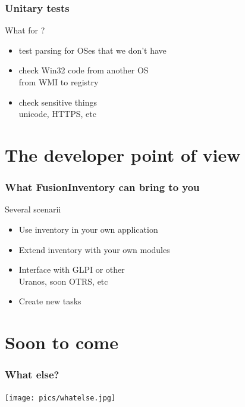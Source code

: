 \documentclass{beamer}
\begin{document}
\begin{frame}
    \frametitle{Unitary tests}

    \begin{block}{What for ?}
        \begin{itemize}
            \item test parsing for OSes that we don't have
            \item check Win32 code from another OS \\
            \small{from WMI to registry}
            \item check sensitive things \\
            \small{unicode, HTTPS, etc}
        \end{itemize}
    \end{block}

\end{frame}

\section{The developer point of view}

\begin{frame}
    \frametitle{What FusionInventory can bring to you}

    \begin{block}{Several scenarii}
        \begin{itemize}
            \item Use inventory in your own application
            \item Extend inventory with your own modules
            \item Interface with GLPI or other \\
            \small{Uranos, soon OTRS, etc}
            \item Create new tasks
        \end{itemize}
    \end{block}

\end{frame}

\section{Soon to come}

\begin{frame}
    \frametitle{What else?}

    \begin{center}
    \texttt{[image: pics/whatelse.jpg]}
    \end{center}

\end{frame}
\end{document}
